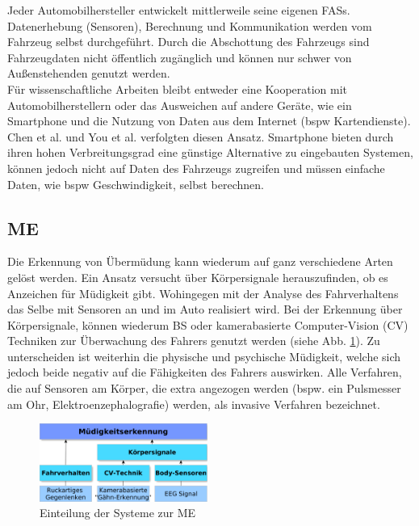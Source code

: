{Jeder Automobilhersteller entwickelt mittlerweile seine eigenen \acl{FASs}. Datenerhebung (Sensoren), Berechnung und Kommunikation werden vom Fahrzeug selbst durchgeführt. Durch die Abschottung des Fahrzeugs sind Fahrzeugdaten nicht öffentlich zugänglich und können nur schwer von Außenstehenden genutzt werden. \\

Für wissenschaftliche Arbeiten bleibt entweder eine Kooperation mit Automobilherstellern oder das Ausweichen auf andere Geräte, wie ein Smartphone und die Nutzung von Daten aus dem Internet (\acl{bspw} Kartendienste). Chen et al. \cite{Chen:2015:ISV:2742647.2742659} und You et al. \cite{You:2013:CAA:2462456.2465428} verfolgten diesen Ansatz. Smartphone bieten durch ihren hohen Verbreitungsgrad eine günstige Alternative zu eingebauten Systemen, können jedoch nicht auf Daten des Fahrzeugs zugreifen und müssen einfache Daten, wie \acl{bspw} Geschwindigkeit, selbst berechnen.

\subsection{\acl{ME}}
Die Erkennung von Übermüdung kann wiederum auf ganz verschiedene Arten gelöst werden. Ein Ansatz versucht über Körpersignale herauszufinden, ob es Anzeichen für Müdigkeit gibt. Wohingegen mit der Analyse des Fahrverhaltens das Selbe mit Sensoren an und im Auto realisiert wird.
Bei der Erkennung über Körpersignale, können wiederum \acl{BS} oder kamerabasierte  Computer-Vision (CV) Techniken zur Überwachung des Fahrers genutzt werden (siehe Abb. \ref{fig:ddd}). Zu unterscheiden ist weiterhin die physische und psychische Müdigkeit, welche sich jedoch beide negativ auf die Fähigkeiten des Fahrers auswirken. Alle Verfahren, die auf Sensoren am Körper, die extra angezogen werden (bspw. ein Pulsmesser am Ohr, Elektroenzephalografie) werden, als invasive Verfahren bezeichnet. 

\begin{figure}[h] 
  \begin{center}
    \includegraphics[width=5.5cm]{img/ddd}
    \caption{Einteilung der Systeme zur \acl{ME}}
    \label{fig:ddd}
  \end{center}
\end{figure}

}
